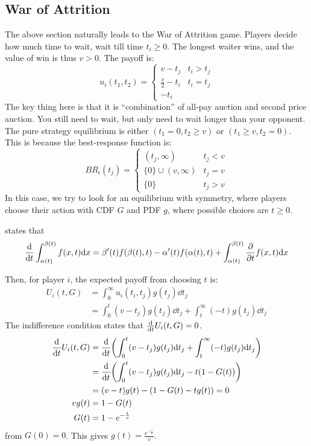 \subsection{War of Attrition}
The above section naturally leads to the War of Attrition game. Players decide how much time to wait, wait till time $t_i \ge 0$. The longest waiter wins, and the value of win is thus $v > 0$. The payoff is:
$$u_i(t_1, t_2) = \begin{cases}
    v - t_j & t_i > t_j \\
    \frac{v}{2} - t_i & t_i = t_j \\
    -t_i
\end{cases}$$
The key thing here is that it is ``combination'' of all-pay auction and second price auction. You still need to wait, but only need to wait longer than your opponent. \\
The pure strategy equilibrium is either $(t_1 = 0, t_2 \ge v)$ or $(t_1 \ge v, t_2 = 0)$. This is because the best-response function is:
$$BR_i(t_j) = \begin{cases}
    (t_j, \infty) & t_j < v \\
    \{0\} \cup (v, \infty) & t_j = v \\
    \{0\} & t_j > v
\end{cases}$$
In this case, we try to look for an equilibrium with symmetry, where players choose their action with CDF $G$ and PDF $g$, where possible choices are $t \ge 0$.
\begin{theorem}
     states that
    $$\dv{t}\int_{\alpha(t)}^{\beta(t)} f(x, t)\dd x = \beta'(t)f(\beta(t), t) - \alpha'(t)f(\alpha(t), t) + \int_{\alpha(t)}^{\beta(t)} \pdv{t} f(x, t)\dd x$$
\end{theorem}
Then, for player $i$, the expected payoff from choosing $t$ is:
\begin{align*}
    U_i(t, G) &= \int_{0}^{\infty} u_i(t_i, t_j) g(t_j) \dd t_j \\
    &= \int_{0}^{t} (v - t_j)g(t_j) \dd t_j + \int_{t}^{\infty} (-t)g(t_j) \dd t_j
\end{align*}
The indifference condition states that $\dv{t} U_i(t, G) = 0$.
\begin{align*}
    \dv{t}U_i(t, G) &= \dv{t} (\int_{0}^{t} (v - t_j)g(t_j) \dd t_j + \int_{t}^{\infty} (-t)g(t_j) \dd t_j) \\
    &= \dv{t} (\int_{0}^{t} (v - t_j)g(t_j) \dd t_j - t(1 - G(t))) \\
    &= (v-t)g(t) - (1 - G(t) - tg(t)) = 0 \\
    vg(t) &= 1 - G(t) \\
    G(t) &= 1 - e^{-\frac{t}{v}}
\end{align*}
from $G(0) = 0$. This gives $g(t) = \frac{e^{-\frac{t}{v}}}{v}$.

\newpage